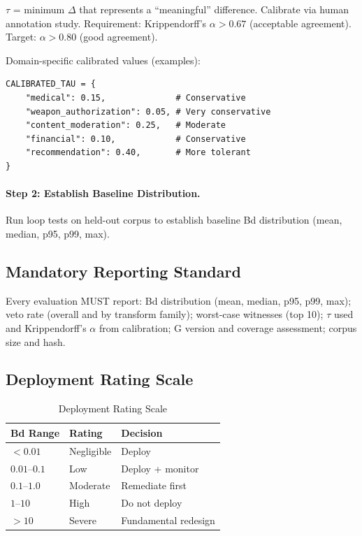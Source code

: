 \documentclass[11pt,letterpaper]{article}
\theoremstyle{definition}
\theoremstyle{remark}
\begin{document}
$\tau$ = minimum $\Delta$ that represents a ``meaningful'' difference. Calibrate via human annotation study. Requirement: Krippendorff's $\alpha > 0.67$ (acceptable agreement). Target: $\alpha > 0.80$ (good agreement).

Domain-specific calibrated values (examples):
\begin{verbatim}
CALIBRATED_TAU = {
    "medical": 0.15,              # Conservative
    "weapon_authorization": 0.05, # Very conservative
    "content_moderation": 0.25,   # Moderate
    "financial": 0.10,            # Conservative
    "recommendation": 0.40,       # More tolerant
}
\end{verbatim}

\paragraph{Step 2: Establish Baseline Distribution.}
Run loop tests on held-out corpus to establish baseline Bd distribution (mean, median, p95, p99, max).

\subsection{Mandatory Reporting Standard}

Every evaluation MUST report: Bd distribution (mean, median, p95, p99, max); veto rate (overall and by transform family); worst-case witnesses (top 10); $\tau$ used and Krippendorff's $\alpha$ from calibration; G version and coverage assessment; corpus size and hash.

\subsection{Deployment Rating Scale}

\begin{table}[h]
\centering
\begin{tabular}{@{}lll@{}}
\toprule
\textbf{Bd Range} & \textbf{Rating} & \textbf{Decision} \\
\midrule
$< 0.01$ & Negligible & Deploy \\
$0.01$--$0.1$ & Low & Deploy + monitor \\
$0.1$--$1.0$ & Moderate & Remediate first \\
$1$--$10$ & High & Do not deploy \\
$> 10$ & Severe & Fundamental redesign \\
\bottomrule
\end{tabular}
\caption{Deployment Rating Scale}
\end{table}
\end{document}
